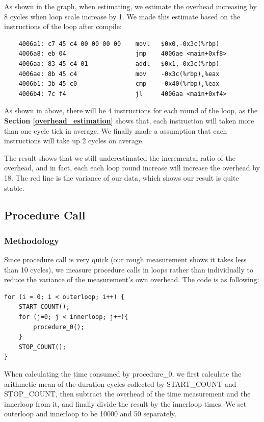 As shown in the graph, when estimating, we estimate the overhead increasing by 8 cycles when loop scale increase by 1. We made this estimate based on the instructions of the loop after compile:

\begin{lstlisting}
    4006a1:	c7 45 c4 00 00 00 00 	movl   $0x0,-0x3c(%rbp)
    4006a8:	eb 04                	jmp    4006ae <main+0xf8>
    4006aa:	83 45 c4 01          	addl   $0x1,-0x3c(%rbp)
    4006ae:	8b 45 c4             	mov    -0x3c(%rbp),%eax
    4006b1:	3b 45 c0             	cmp    -0x40(%rbp),%eax
    4006b4:	7c f4                	jl     4006aa <main+0xf4>
\end{lstlisting}

As shown in above, there will be 4 instructions for each round of the loop, as the \textbf{Section \ref{overhead_estimation}} shows that, each instruction will taken more than one cycle tick in average.
We finally made a assumption that each instructions will take up 2 cycles on average.

The result shows that we still underestimated the incremental ratio of the overhead, and in fact, each each loop round increase will increase the overhead by 18. The red line is the variance of our data, which shows our result is quite stable.

\subsection{Procedure Call}

\subsubsection{Methodology}

Since procedure call is very quick (our rough measurement shows it takes less than 10 cycles), we measure procedure calls in loops rather than individually to reduce the variance of the measurement's own overhead. The code is as following:

\begin{lstlisting}
for (i = 0; i < outerloop; i++) {
    START_COUNT();
    for (j=0; j < innerloop; j++){
        procedure_0();
    }
    STOP_COUNT();
}
\end{lstlisting}

When calculating the time consumed by procedure\_0, we first calculate the arithmetic mean of the duration cycles collected by START\_COUNT and STOP\_COUNT, then subtract the overhead of the time measurement and the innerloop from it, and finally divide the result by the innerloop times. We set outerloop and innerloop to be 10000 and 50 separately.

